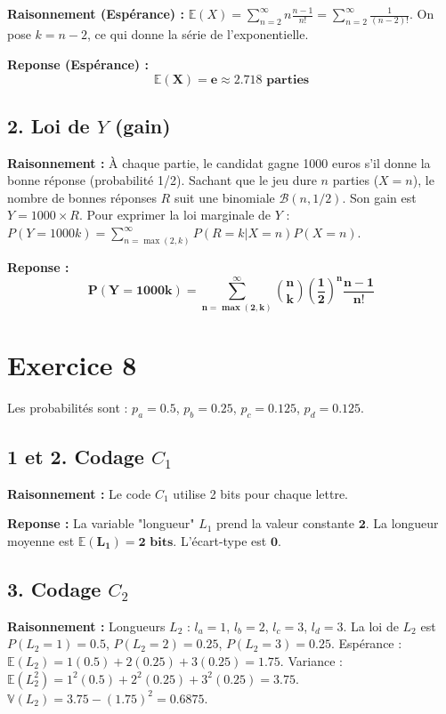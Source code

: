 \documentclass[11pt,a4paper]{article}
\begin{document}
\textbf{Raisonnement (Espérance) :} $\mathbb{E}(X) = \sum_{n=2}^{\infty} n \frac{n-1}{n!} = \sum_{n=2}^{\infty} \frac{1}{(n-2)!}$. On pose $k = n-2$, ce qui donne la série de l'exponentielle.

\textbf{Reponse (Espérance) :} 
$$
\mathbf{\mathbb{E}(X) = e \approx 2.718 \text{ parties}}
$$

\subsection*{2. Loi de $Y$ (gain)}

\textbf{Raisonnement :} À chaque partie, le candidat gagne 1000 euros s'il donne la bonne réponse (probabilité 1/2). Sachant que le jeu dure $n$ parties ($X=n$), le nombre de bonnes réponses $R$ suit une binomiale $\mathcal{B}(n, 1/2)$. Son gain est $Y = 1000 \times R$.
Pour exprimer la loi marginale de $Y$ : $P(Y = 1000k) = \sum_{n=\max(2, k)}^{\infty} P(R=k | X=n)P(X=n)$.

\textbf{Reponse :} 
$$
\mathbf{P(Y = 1000k) = \sum_{n=\max(2, k)}^{\infty} \binom{n}{k} \left(\frac{1}{2}\right)^n \frac{n-1}{n!}}
$$

\hrulefill

\section*{Exercice 8}

Les probabilités sont : $p_a = 0.5$, $p_b = 0.25$, $p_c = 0.125$, $p_d = 0.125$.

\subsection*{1 et 2. Codage $C_1$}

\textbf{Raisonnement :} Le code $C_1$ utilise 2 bits pour chaque lettre. 

\textbf{Reponse :} La variable "longueur" $L_1$ prend la valeur constante $\mathbf{2}$. La longueur moyenne est $\mathbf{\mathbb{E}(L_1) = 2 \text{ bits}}$. L'écart-type est $\mathbf{0}$.

\subsection*{3. Codage $C_2$}

\textbf{Raisonnement :} Longueurs $L_2$ : $l_a = 1$, $l_b = 2$, $l_c = 3$, $l_d = 3$. La loi de $L_2$ est $P(L_2 = 1) = 0.5$, $P(L_2 = 2) = 0.25$, $P(L_2 = 3) = 0.25$.
Espérance : $\mathbb{E}(L_2) = 1(0.5) + 2(0.25) + 3(0.25) = 1.75$.
Variance : $\mathbb{E}(L_2^2) = 1^2(0.5) + 2^2(0.25) + 3^2(0.25) = 3.75$. $\mathbb{V}(L_2) = 3.75 - (1.75)^2 = 0.6875$.
\end{document}

